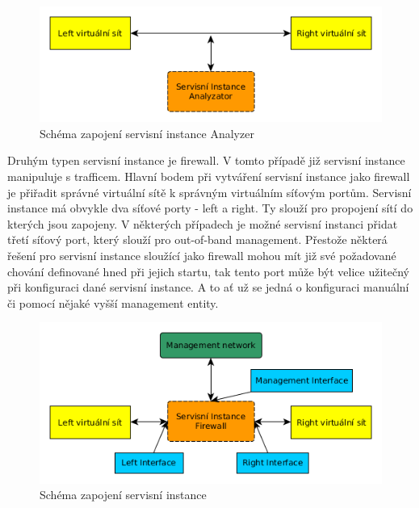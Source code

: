 \begin{figure}[h]
\begin{centering}
\includegraphics[scale=0.63]{images/service_instance_anal}
\par\end{centering}
\caption{Schéma zapojení servisní instance Analyzer\label{fig:service_instance_anal}}
\end{figure}

Druhým typen servisní instance je firewall. V tomto případě již servisní instance manipuluje s trafficem. Hlavní bodem při vytváření servisní instance jako firewall je přiřadit správné virtuální sítě k správným virtuálním síťovým portům. Servisní instance má obvykle dva síťové porty - left a right. Ty slouží pro propojení sítí do kterých jsou zapojeny. V některých případech je možné servisní instanci přidat třetí síťový port, který slouží pro out-of-band management. Přestože některá řešení pro servisní instance sloužící jako firewall mohou mít již své požadované chování definované hned při jejich startu, tak tento port může být velice užitečný při konfiguraci dané servisní instance. A to ať už se jedná o konfiguraci manuální či pomocí nějaké vyšší management entity.

\begin{figure}[h]
\begin{centering}
\includegraphics[scale=0.63]{images/service_instance}
\par\end{centering}
\caption{Schéma zapojení servisní instance\label{fig:service_instance}}
\end{figure}


